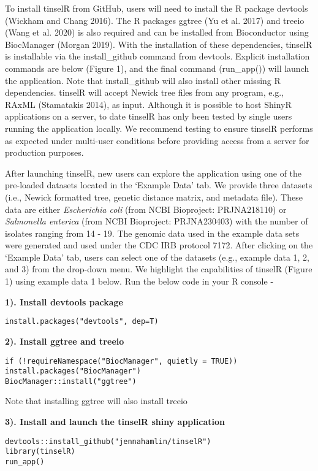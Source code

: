\documentclass[
]{article}
\begin{document}
To install tinselR from GitHub, users will need to install the R package
devtools (Wickham and Chang 2016). The R packages ggtree (Yu et al.
2017) and treeio (Wang et al. 2020) is also required and can be
installed from Bioconductor using BiocManager (Morgan 2019). With the
installation of these dependencies, tinselR is installable via the
install\_github command from devtools. Explicit installation commands
are below (Figure 1), and the final command (run\_app()) will launch the
application. Note that install\_github will also install other missing R
dependencies. tinselR will accept Newick tree files from any program,
e.g., RAxML (Stamatakis 2014), as input. Although it is possible to host
ShinyR applications on a server, to date tinselR has only been tested by
single users running the application locally. We recommend testing to
ensure tinselR performs as expected under multi-user conditions before
providing access from a server for production purposes.

After launching tinselR, new users can explore the application using one
of the pre-loaded datasets located in the `Example Data' tab. We provide
three datasets (i.e., Newick formatted tree, genetic distance matrix,
and metadata file). These data are either \emph{Escherichia coli} (from
NCBI Bioproject: PRJNA218110) or \emph{Salmonella enterica} (from NCBI
Bioproject: PRJNA230403) with the number of isolates ranging from 14 -
19. The genomic data used in the example data sets were generated and
used under the CDC IRB protocol 7172. After clicking on the `Example
Data' tab, users can select one of the datasets (e.g., example data 1,
2, and 3) from the drop-down menu. We highlight the capabilities of
tinselR (Figure 1) using example data 1 below. Run the below code in
your R console -

\textbf{1). Install devtools package}

\texttt{install.packages("devtools",\ dep=T)}

\textbf{2). Install ggtree and treeio}

\begin{verbatim}
if (!requireNamespace("BiocManager", quietly = TRUE))
install.packages("BiocManager")
BiocManager::install("ggtree")
\end{verbatim}

Note that installing ggtree will also install treeio

\textbf{3). Install and launch the tinselR shiny application}

\begin{verbatim}
devtools::install_github("jennahamlin/tinselR")
library(tinselR)
run_app()
\end{verbatim}
\end{document}

